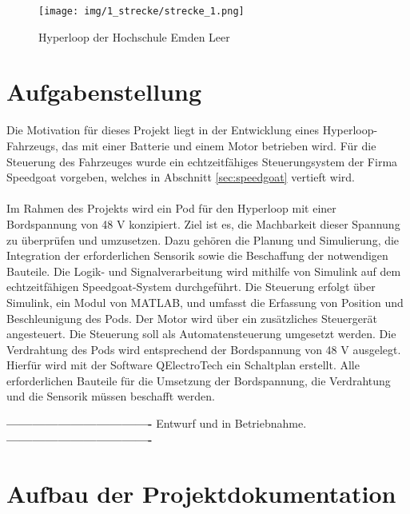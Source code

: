 \begin{figure}[ht]
	\begin{center}
		\texttt{[image: img/1\_strecke/strecke\_1.png]}
		\caption{Hyperloop der Hochschule Emden Leer}
		\label{img_1_1:strecke}
	\end{center}
\end{figure}
\newpage



\section{Aufgabenstellung}


Die Motivation für dieses Projekt liegt in der Entwicklung eines Hyperloop-Fahrzeugs, das mit einer Batterie und einem Motor betrieben wird. Für die Steuerung des Fahrzeuges wurde ein echtzeitfähiges Steuerungsystem der Firma Speedgoat vorgeben, welches in Abschnitt \ref{sec:speedgoat} vertieft wird.\\ \ \\

Im Rahmen des Projekts wird ein Pod für den Hyperloop mit einer Bordspannung von 48 V konzipiert. Ziel ist es, die Machbarkeit dieser Spannung zu überprüfen und umzusetzen. Dazu gehören die Planung und Simulierung, die Integration der erforderlichen Sensorik sowie die Beschaffung der notwendigen Bauteile. Die Logik- und Signalverarbeitung wird mithilfe von Simulink auf dem echtzeitfähigen Speedgoat-System durchgeführt.
Die Steuerung erfolgt über Simulink, ein Modul von MATLAB, und umfasst die Erfassung von Position und Beschleunigung des Pods. Der Motor wird über ein zusätzliches Steuergerät angesteuert. Die Steuerung soll als Automatensteuerung umgesetzt werden.
Die Verdrahtung des Pods wird entsprechend der Bordspannung von 48 V ausgelegt. Hierfür wird mit der Software QElectroTech ein Schaltplan erstellt.
Alle erforderlichen Bauteile für die Umsetzung der Bordspannung, die Verdrahtung und die Sensorik müssen beschafft werden.

\textbf{----------------------------------}\newline
Entwurf und in Betriebnahme.
\textbf{----------------------------------}

\pagebreak

\section{Aufbau der Projektdokumentation }
